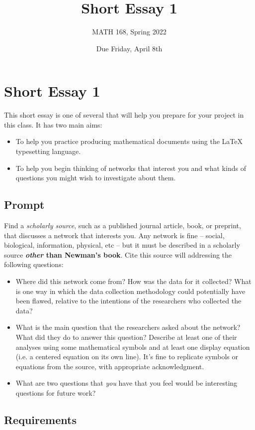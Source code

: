 \documentclass{hw}
\title{Short Essay 1}
\author{MATH 168, Spring 2022}
\date{Due Friday, April 8th}
\begin{document}
\section*{Short Essay 1}

This short essay is one of several that will help you prepare for your project in this class. 
It has two main aims: 
\begin{itemize}
    \item To help you practice producing mathematical documents using the \LaTeX{} typesetting language. 
    \item To help you begin thinking of networks that interest you and what kinds of questions you might wish to investigate about them. 
\end{itemize}

\subsection*{Prompt}

Find a \emph{scholarly source}, such as a published journal article, book, or preprint, that discusses a network that interests you. 
Any network is fine -- social, biological, information, physical, etc -- but it must be described in a scholarly source \textbf{\emph{other} than Newman's book}. 
Cite this source will addressing the following questions: 
\begin{itemize}
    \item Where did this network come from? How was the data for it collected? What is one way in which the data collection methodology could potentially have been flawed, relative to the intentions of the researchers who collected the data? 
    \item What is the main question that the researchers asked about the network? What did they do to answer this question? Describe at least one of their analyses using some mathematical symbols and at least one display equation (i.e. a centered equation on its own line). 
    It's fine to replicate symbols or equations from the source, with appropriate acknowledgment. 
    \item What are two questions that \emph{you} have that you feel would be interesting questions for future work? 
\end{itemize}

\subsection*{Requirements}
\end{document}
